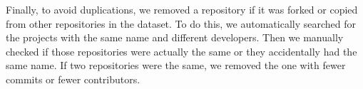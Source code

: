 Finally, to avoid duplications, we removed a repository if it was forked 
or copied from other repositories in the dataset. To do this, we automatically 
searched for the projects with the same name and different developers. 
Then we manually checked if those repositories were actually the same or 
they accidentally had the same name. If two repositories were the same, 
we removed the one with fewer commits or fewer contributors.